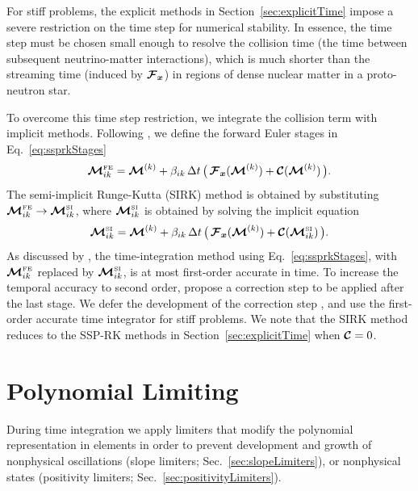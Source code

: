 \documentclass[10pt,preprint]{aastex}
\begin{document}
For stiff problems, the explicit methods in Section~\ref{sec:explicitTime} impose a severe restriction on the time step for numerical stability.  
In essence, the time step must be chosen small enough to resolve the collision time (the time between subsequent neutrino-matter interactions), which is much shorter than the streaming time (induced by $\boldsymbol{\mathcal{F}}_{\boldsymbol{x}}$) in regions of dense nuclear matter in a proto-neutron star.  

To overcome this time step restriction, we integrate the collision term with implicit methods.  
Following \citet{chertock_etal_2015}, we define the forward Euler stages in Eq.~\eqref{eq:ssprkStages}
\begin{equation}
  \boldsymbol{\mathcal{M}}_{ik}^{\mbox{\tiny FE}}
  =\boldsymbol{\mathcal{M}}^{(k)}+\beta_{ik}\,\Delta t\,\big(\,\boldsymbol{\mathcal{F}}_{\boldsymbol{x}}(\boldsymbol{\mathcal{M}}^{(k)})+\boldsymbol{\mathcal{C}}(\boldsymbol{\mathcal{M}}^{(k)})\,\big).  
\end{equation}
The semi-implicit Runge-Kutta (SIRK) method is obtained by substituting $\boldsymbol{\mathcal{M}}_{ik}^{\mbox{\tiny FE}}\to\boldsymbol{\mathcal{M}}_{ik}^{\mbox{\tiny SI}}$, where $\boldsymbol{\mathcal{M}}_{ik}^{\mbox{\tiny SI}}$ is obtained by solving the implicit equation
\begin{equation}
  \boldsymbol{\mathcal{M}}_{ik}^{\mbox{\tiny SI}}
  =\boldsymbol{\mathcal{M}}^{(k)}+\beta_{ik}\,\Delta t\,\big(\,\boldsymbol{\mathcal{F}}_{\boldsymbol{x}}(\boldsymbol{\mathcal{M}}^{(k)})+\boldsymbol{\mathcal{C}}(\boldsymbol{\mathcal{M}}_{ik}^{\mbox{\tiny SI}})\,\big).  
\end{equation}
As discussed by \citet{chertock_etal_2015}, the time-integration method using Eq.~\eqref{eq:ssprkStages}, with $\boldsymbol{\mathcal{M}}_{ik}^{\mbox{\tiny FE}}$ replaced by $\boldsymbol{\mathcal{M}}_{ik}^{\mbox{\tiny SI}}$, is at most first-order accurate in time.  
To increase the temporal accuracy to second order, \citet{chertock_etal_2015} propose a correction step to be applied after the last stage.  
We defer the development of the correction step \citep[see, e.g.][]{endeveHauck_2017}, and use the first-order accurate time integrator for stiff problems.  
We note that the SIRK method reduces to the SSP-RK methods in Section~\ref{sec:explicitTime} when $\boldsymbol{\mathcal{C}}=0$.  

\section{Polynomial Limiting}

During time integration we apply limiters that modify the polynomial representation in elements in order to prevent development and growth of nonphysical oscillations (slope limiters; Sec.~\ref{sec:slopeLimiters}), or nonphysical states (positivity limiters; Sec.~\ref{sec:positivityLimiters}).  
\end{document}
